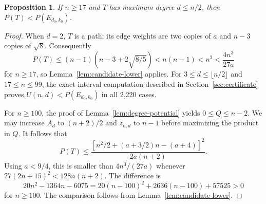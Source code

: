 \documentclass[11pt,a4paper]{article}
\numberwithin{equation}{section}
\newtheorem{proposition}[theorem]{Proposition}
\begin{document}
\begin{proposition}\label{prop:small-degree}
If $n\ge17$ and $T$ has maximum degree $d\le n/2$, then
$P(T)<P(E_{d_0,k_0})$.
\end{proposition}
\begin{proof}
When $d=2$, $T$ is a path: its edge weights are two copies of $a$ and $n-3$ copies of $\sqrt8$. Consequently
\[P(T)\le(n-1)(n-3+2\sqrt{8/5})<n(n-1)<n^2<\frac{4n^3}{27a}
\]
for $n\ge17$, so Lemma~\ref{lem:candidate-lower} applies. For $3\le d\le\lfloor n/2\rfloor$ and $17\le n\le99$, the exact interval computation described in Section~\ref{sec:certificate} proves $U(n,d)<P(E_{d_0,k_0})$ in all 2,220 cases.

For $n\ge100$, the proof of Lemma~\ref{lem:degree-potential} yields $0\le Q\le n-2$. We may increase $A_d$ to $(n+2)/2$ and $z_{n,d}$ to $n-1$ before maximizing the product in $Q$. It follows that
\[
P(T)\le\frac{[n^2/2+(a+3/2)n-(a+4)]^2}{2a(n+2)}.
\]
Using $a<9/4$, this is smaller than $4n^3/(27a)$ whenever
$27(2n+15)^2<128n(n+2)$. The difference is
\[
20n^2-1364n-6075=20(n-100)^2+2636(n-100)+57525>0
\]
for $n\ge100$. The comparison follows from Lemma~\ref{lem:candidate-lower}.
\end{proof}
\end{document}
